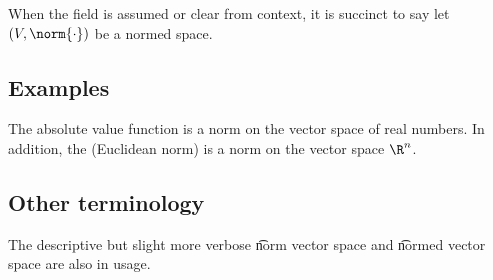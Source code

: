 When the field is assumed or clear from context, it is succinct to say let $(V, \norm{\cdot })$ be a normed space.

\subsection*{Examples}

The absolute value function is a norm on the vector space of real numbers.
In addition, the (Euclidean norm) is a norm on the vector space $\R ^n$.

\subsection*{Other terminology}

The descriptive but slight more verbose \t{norm vector space} and \t{normed vector space} are also in usage.
